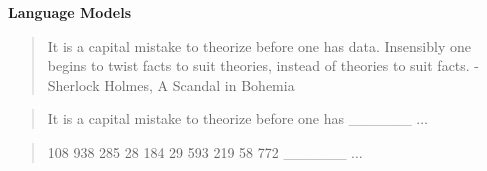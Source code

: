 \documentclass{beamer}
\newcommand{\air}{\vspace{0.25cm}}
\begin{document}
\begin{frame}
  \begin{center}
    \textbf{Language Models}
  \end{center}
\end{frame}

\begin{frame}
  \begin{quote}
    It is a capital mistake to theorize before one has
    data. Insensibly one begins to twist facts to suit theories,
    instead of theories to suit facts. -Sherlock Holmes, A Scandal in Bohemia
  \end{quote}


\end{frame}

\begin{frame}


  \air
   {
    \begin{quote}
    It is a capital mistake to theorize before one has \_\_\_\_\_\_ $\ldots$ 
    \end{quote}
  }
   {
    \begin{quote}
      108 938 285 28 184 29 593 219 58 772 \_\_\_\_\_\_ $\ldots$ 
    \end{quote}    
  }
\end{frame}
\end{document}

